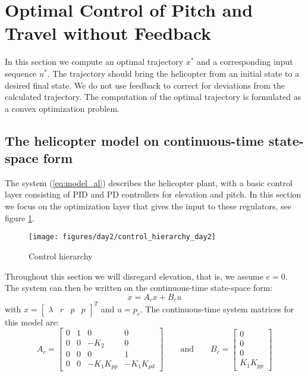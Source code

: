 \section{Optimal Control of Pitch and Travel without Feedback}\label{sec:prob2}

In this section we compute an optimal trajectory $x^*$ and a corresponding input sequence $u^*$. The trajectory should bring the helicopter from an initial state to a desired final state. We do not use feedback to correct for deviations from the calculated trajectory. The computation of the optimal trajectory is formulated as a convex optimization problem.

\subsection{The helicopter model on continuous-time state-space form}
The system (\ref{eq:model_al}) describes the helicopter plant, with a basic control layer consisting of PID and PD controllers for elevation and pitch. In this section we focus on the optimization layer that gives the input to these regulators, see figure \ref{fig:control_hierarchy}.
\begin{figure}[ht]
    \centering
    \texttt{[image: figures/day2/control\_hierarchy\_day2]}
    \caption{Control hierarchy}
    \label{fig:control_hierarchy}
\end{figure}
Throughout this section we will disregard elevation, that is, we assume $e = 0$.
The system can then be written on the continuous-time state-space form:
\begin{equation}
    \dot{x} = A_cx + B_cu
    \label{eq:state_space_axbu}
\end{equation}
with $x = \begin{bmatrix} \lambda & r & p & \dot{p} \end{bmatrix}^T$ and $u = p_c$.
The continuous-time system matrices for this model are:
\begin{equation}
    A_c = \begin{bmatrix} 0 & 1 & 0 & 0 \\ 0 & 0 & -K_2 & 0 \\ 0 & 0 & 0 & 1 \\ 0 & 0 & -K_1K_{pp} & -K_1K_{pd} \end{bmatrix}
    \qquad\text{and}\qquad
    B_c = \begin{bmatrix}0 \\ 0 \\ 0 \\K_1K_{pp} \end{bmatrix}
\end{equation}

